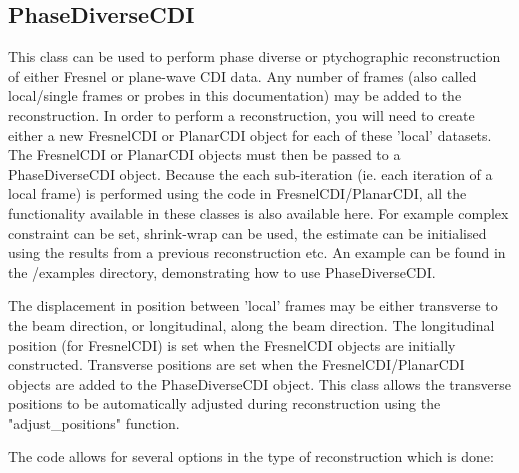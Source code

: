 \documentclass[]{nadia}
\begin{document}
\subsection{PhaseDiverseCDI}
This class can be used to perform phase diverse or ptychographic
reconstruction of either Fresnel or plane-wave CDI data. Any number of
frames (also called local/single frames or probes in this
documentation) may be added to the reconstruction. In order to perform
a reconstruction, you will need to create either a new FresnelCDI or
PlanarCDI object for each of these 'local' datasets. The FresnelCDI or
PlanarCDI objects must then be passed to a PhaseDiverseCDI
object. Because the each sub-iteration (ie. each iteration of a local
frame) is performed using the code in FresnelCDI/PlanarCDI, all the
functionality available in these classes is also available here. For
example complex constraint can be set, shrink-wrap can be used, the
estimate can be initialised using the results from a previous
reconstruction etc. An example can be found in the /examples
directory, demonstrating how to use PhaseDiverseCDI.

The displacement in position between 'local' frames may be either
transverse to the beam direction, or longitudinal, along the beam
direction. The longitudinal position (for FresnelCDI) is set when the
FresnelCDI objects are initially constructed. Transverse positions are
set when the FresnelCDI/PlanarCDI objects are added to the
PhaseDiverseCDI object. This class allows the transverse positions to
be automatically adjusted during reconstruction using the
"adjust\_positions" function.

The code allows for several options in the type of reconstruction
which is done:
\end{document}
